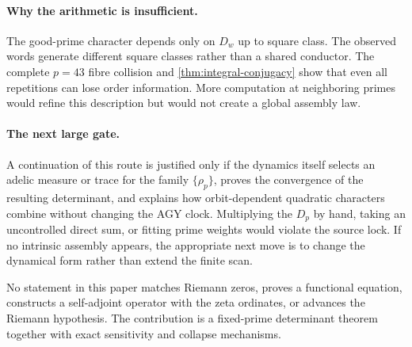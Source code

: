 \paragraph{Why the arithmetic is insufficient.}
The good-prime character depends only on \(D_w\) up to square class.  The
observed words generate different square classes rather than a shared
conductor.  The complete \(p=43\) fibre collision and
\cref{thm:integral-conjugacy} show that even all repetitions can lose order
information.  More computation at neighboring primes would refine this
description but would not create a global assembly law.

\paragraph{The next large gate.}
A continuation of this route is justified only if the dynamics itself
selects an adelic measure or trace for the family \(\{\rho_p\}\), proves the
convergence of the resulting determinant, and explains how orbit-dependent
quadratic characters combine without changing the AGY clock.  Multiplying
the \(D_p\) by hand, taking an uncontrolled direct sum, or fitting prime
weights would violate the source lock.  If no intrinsic assembly appears,
the appropriate next move is to change the dynamical form rather than extend
the finite scan.

No statement in this paper matches Riemann zeros, proves a functional
equation, constructs a self-adjoint operator with the zeta ordinates, or
advances the Riemann hypothesis.  The contribution is a fixed-prime
determinant theorem together with exact sensitivity and collapse mechanisms.

